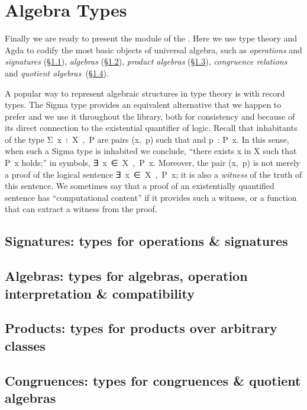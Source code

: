 \section{Algebra Types}\label{sec:algebra-types}
Finally we are ready to present the  module of the \agdaualib. Here we use type theory and Agda to codify the most basic objects of universal algebra, such as \emph{operations} and \emph{signatures} (\S\ref{sec:oper-sign}), \emph{algebras} (\S\ref{sec:algebras}), \emph{product algebras} (\S\ref{sec:product-algebras}), \emph{congruence relations} and \emph{quotient algebras}~(\S\ref{congruences}).

A popular way to represent algebraic structures in type theory is with record types. The Sigma type provides an equivalent alternative that we happen to prefer and we use it throughout the library, both for consistency and because of its direct connection to the existential quantifier of logic. Recall that inhabitants of the type \ad Σ~\ab x~\af ꞉~\ab X~\af ,~\ab P are pairs (\ab x,~\ab p) such that  and \ab p~\as : \ab P~\ab x. In this sense, when such a Sigma type is inhabited we conclude, ``there exists \ab x in \ab X such that \ab P~\ab x holds;'' in symbols, \as ∃~\ab x~\af ∈~\ab X~\af ,~\ab P~\ab x.  %
Moreover, the pair (\ab x,~\ab p) is not merely a proof of the logical sentence \as ∃~\ab x~\af ∈~\ab X~\af ,~\ab P~\ab x; it is also a \emph{witness} of the truth of this sentence. We sometimes say that a proof of an existentially quantified sentence has ``computational content'' if it provides such a witness, or a function that can extract a witness from the proof.

\subsection{Signatures: types for operations \& signatures}\label{sec:oper-sign}


\subsection{Algebras: types for algebras, operation interpretation \& compatibility}\label{sec:algebras}


\subsection{Products: types for products over arbitrary classes}\label{sec:product-algebras}


\subsection{Congruences: types for congruences \& quotient algebras}\label{congruences}

